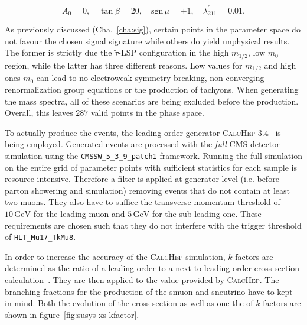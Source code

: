 \begin{equation}
  \label{eq:gen-mssm-parameters}
  A_0 = 0, \quad \tan{\beta} = 20, \quad \text{sgn}\,\mu = +1, \quad \lambda^\prime_{211} = 0.01.
\end{equation}

As previously discussed (Cha.~\ref{cha:sig}), certain points in the parameter space do not favour the chosen signal signature while others do yield unphysical results. The former is strictly due the $\tilde{\tau}$-LSP configuration in the high $m_{1/2}$, low $m_0$ region, while the latter has three different reasons. Low values for $m_{1/2}$ and high ones $m_0$ can lead to no electroweak symmetry breaking, non-converging renormalization group equations or the production of tachyons. When generating the mass spectra, all of these scenarios are being excluded before the production. Overall, this leaves $287$ valid points in the phase space.

To actually produce the events, the leading order generator \textsc{CalcHep 3.4}~\cite{calchep} is being employed. Generated events are processed with the \textit{full} CMS detector simulation using the \verb+CMSSW_5_3_9_patch1+ framework. Running the full simulation on the entire grid of parameter points with sufficient statistics for each sample is resource intensive. Therefore a filter is applied at generator level (i.e. before parton showering and simulation) removing events that do not contain at least two muons. They also have to suffice the transverse momentum threshold of $10\,\text{GeV}$ for the leading muon and $5\,\text{GeV}$ for the sub leading one. These requirements are chosen such that they do not interfere with the trigger threshold of \verb+HLT_Mu17_TkMu8+.

In order to increase the accuracy of the \textsc{CalcHep} simulation, $k$-factors are determined as the ratio of a leading order to a next-to leading order cross section calculation~\cite{susyxstool}. They are then applied to the value provided by \textsc{CalcHep}. The branching fractions for the production of the smuon and sneutrino have to kept in mind. Both the evolution of the cross section as well as one the of $k$-factors are shown in figure~\ref{fig:susys-xs-kfactor}.


